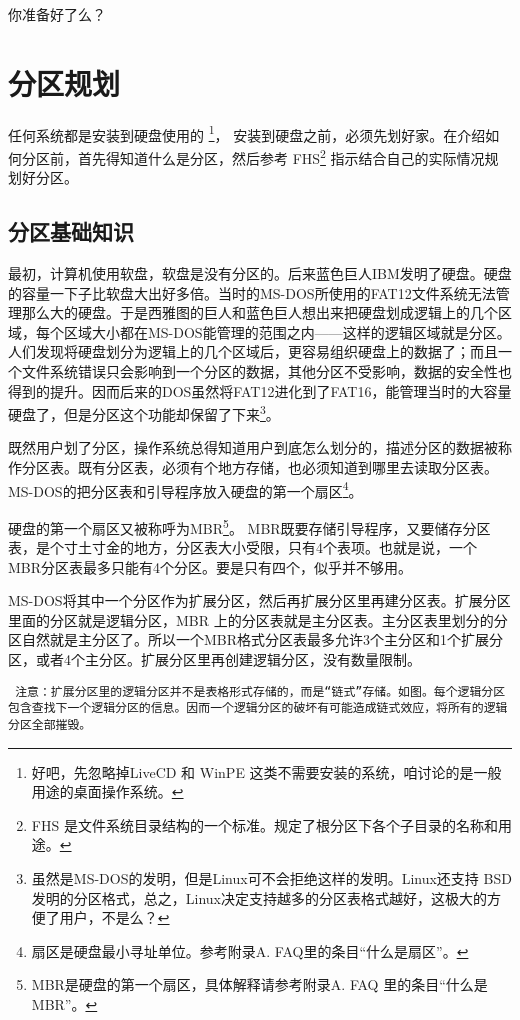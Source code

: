 \documentclass[amstex,twoside]{ctexbook}
\newenvironment{notice}{\tt}{}
\begin{document}
你准备好了么？

\section{分区规划}
任何系统都是安装到硬盘使用的
\footnote{好吧，先忽略掉LiveCD 和  WinPE 这类不需要安装的系统，咱讨论的是一般用途的桌面操作系统。}，
安装到硬盘之前，必须先划好家。在介绍如何分区前，首先得知道什么是分区，然后参考
FHS\footnote{FHS 是文件系统目录结构的一个标准。规定了根分区下各个子目录的名称和用途。}
指示结合自己的实际情况规划好分区。

\subsection{分区基础知识}
最初，计算机使用软盘，软盘是没有分区的。后来蓝色巨人IBM发明了硬盘。硬盘的容量一下子比软盘大出好多倍。当时的MS-DOS所使用的FAT12文件系统无法管理那么大的硬盘。于是西雅图的巨人和蓝色巨人想出来把硬盘划成逻辑上的几个区域，每个区域大小都在MS-DOS能管理的范围之内——这样的逻辑区域就是分区。人们发现将硬盘划分为逻辑上的几个区域后，更容易组织硬盘上的数据了；而且一个文件系统错误只会影响到一个分区的数据，其他分区不受影响，数据的安全性也得到的提升。因而后来的DOS虽然将FAT12进化到了FAT16，能管理当时的大容量硬盘了，但是分区这个功能却保留了下来\footnote{虽然是MS-DOS的发明，但是Linux可不会拒绝这样的发明。Linux还支持 BSD 发明的分区格式，总之，Linux决定支持越多的分区表格式越好，这极大的方便了用户，不是么？}。

既然用户划了分区，操作系统总得知道用户到底怎么划分的，描述分区的数据被称作分区表。既有分区表，必须有个地方存储，也必须知道到哪里去读取分区表。MS-DOS的把分区表和引导程序放入硬盘的第一个扇区\footnote{扇区是硬盘最小寻址单位。参考附录A. FAQ里的条目“什么是扇区”。}。

硬盘的第一个扇区又被称呼为MBR\footnote{MBR是硬盘的第一个扇区，具体解释请参考附录A. FAQ 里的条目“什么是 MBR”。}。
MBR既要存储引导程序，又要储存分区表，是个寸土寸金的地方，分区表大小受限，只有4个表项。也就是说，一个 MBR分区表最多只能有4个分区。要是只有四个，似乎并不够用。

MS-DOS将其中一个分区作为扩展分区，然后再扩展分区里再建分区表。扩展分区里面的分区就是逻辑分区，MBR 上的分区表就是主分区表。主分区表里划分的分区自然就是主分区了。所以一个MBR格式分区表最多允许3个主分区和1个扩展分区，或者4个主分区。扩展分区里再创建逻辑分区，没有数量限制。

\begin{notice}
注意：扩展分区里的逻辑分区并不是表格形式存储的，而是“链式”存储。如图。每个逻辑分区包含查找下一个逻辑分区的信息。因而一个逻辑分区的破坏有可能造成链式效应，将所有的逻辑分区全部摧毁。
\end{notice}
\end{document}
